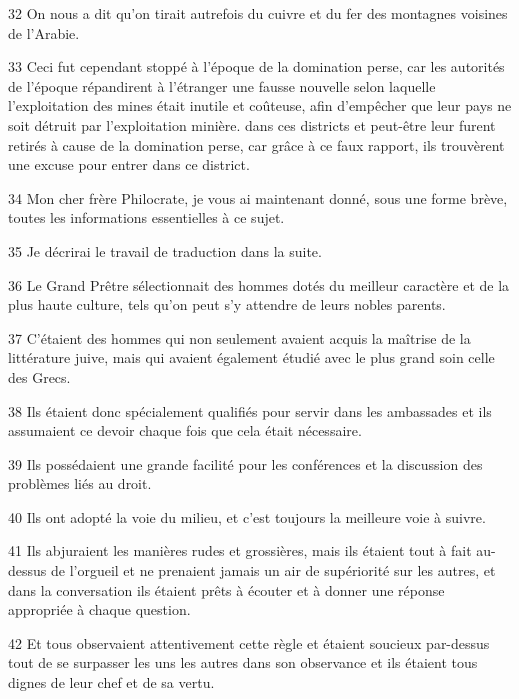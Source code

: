 \par 32 On nous a dit qu'on tirait autrefois du cuivre et du fer des montagnes voisines de l'Arabie.

\par 33 Ceci fut cependant stoppé à l'époque de la domination perse, car les autorités de l'époque répandirent à l'étranger une fausse nouvelle selon laquelle l'exploitation des mines était inutile et coûteuse, afin d'empêcher que leur pays ne soit détruit par l'exploitation minière. dans ces districts et peut-être leur furent retirés à cause de la domination perse, car grâce à ce faux rapport, ils trouvèrent une excuse pour entrer dans ce district.

\par 34 Mon cher frère Philocrate, je vous ai maintenant donné, sous une forme brève, toutes les informations essentielles à ce sujet.

\par 35 Je décrirai le travail de traduction dans la suite.

\par 36 Le Grand Prêtre sélectionnait des hommes dotés du meilleur caractère et de la plus haute culture, tels qu'on peut s'y attendre de leurs nobles parents.

\par 37 C'étaient des hommes qui non seulement avaient acquis la maîtrise de la littérature juive, mais qui avaient également étudié avec le plus grand soin celle des Grecs.

\par 38 Ils étaient donc spécialement qualifiés pour servir dans les ambassades et ils assumaient ce devoir chaque fois que cela était nécessaire.

\par 39 Ils possédaient une grande facilité pour les conférences et la discussion des problèmes liés au droit.

\par 40 Ils ont adopté la voie du milieu, et c'est toujours la meilleure voie à suivre.

\par 41 Ils abjuraient les manières rudes et grossières, mais ils étaient tout à fait au-dessus de l'orgueil et ne prenaient jamais un air de supériorité sur les autres, et dans la conversation ils étaient prêts à écouter et à donner une réponse appropriée à chaque question.

\par 42 Et tous observaient attentivement cette règle et étaient soucieux par-dessus tout de se surpasser les uns les autres dans son observance et ils étaient tous dignes de leur chef et de sa vertu.


